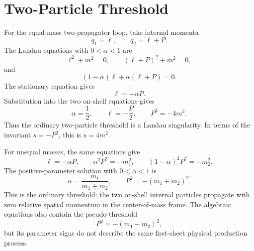 \section{Two-Particle Threshold}

For the equal-mass two-propagator loop, take internal momenta
\[
  q_1=\ell,\qquad q_2=\ell+P .
\]
The Landau equations with \(0<\alpha<1\) are
\[
  \ell^2+m^2=0,\qquad
  (\ell+P)^2+m^2=0,
\]
and
\[
  (1-\alpha)\ell+\alpha(\ell+P)=0 .
\]
The stationary equation gives
\[
  \ell=-\alpha P .
\]
Substitution into the two on-shell equations gives
\[
  \alpha=\frac12,\qquad
  \ell=-\frac{P}{2},\qquad
  P^2=-4m^2 .
\]
Thus the ordinary two-particle threshold is a Landau singularity.
In terms of the invariant \(s=-P^2\), this is \(s=4m^2\).

\begin{center}
\end{center}

For unequal masses, the same equations give
\[
  \ell=-\alpha P,\qquad
  \alpha^2P^2=-m_1^2,\qquad
  (1-\alpha)^2P^2=-m_2^2 .
\]
The positive-parameter solution with \(0<\alpha<1\) is
\[
  \alpha=\frac{m_1}{m_1+m_2},
  \qquad
  P^2=-(m_1+m_2)^2 .
\]
This is the ordinary threshold: the two on-shell internal particles propagate
with zero relative spatial momentum in the center-of-mass frame.  The
algebraic equations also contain the pseudo-threshold
\[
  P^2=-(m_1-m_2)^2,
\]
but its parameter signs do not describe the same first-sheet physical
production process.

